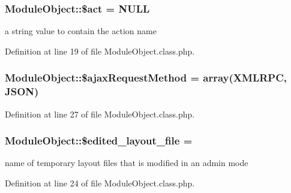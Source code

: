 \subsubsection[{\$act}]{\setlength{\rightskip}{0pt plus 5cm}Module\+Object\+::\$act = N\+U\+L\+L}\label{classModuleObject_a9d43905d072c53cd5cd239d706215895}


a string value to contain the action name 



Definition at line 19 of file Module\+Object.\+class.\+php.

\hypertarget{classModuleObject_a783d38cb68310dc6e5a1f6c1cc6c6b84}{}
\subsubsection[{\$ajax\+Request\+Method}]{\setlength{\rightskip}{0pt plus 5cm}Module\+Object\+::\$ajax\+Request\+Method = array(\textquotesingle{}X\+M\+L\+R\+P\+C\textquotesingle{}, \textquotesingle{}J\+S\+O\+N\textquotesingle{})}\label{classModuleObject_a783d38cb68310dc6e5a1f6c1cc6c6b84}


Definition at line 27 of file Module\+Object.\+class.\+php.

\hypertarget{classModuleObject_a1fcbb01c627ce5ff104c05f54715bd61}{}
\subsubsection[{\$edited\+\_\+layout\+\_\+file}]{\setlength{\rightskip}{0pt plus 5cm}Module\+Object\+::\$edited\+\_\+layout\+\_\+file = \textquotesingle{}\textquotesingle{}}\label{classModuleObject_a1fcbb01c627ce5ff104c05f54715bd61}


name of temporary layout files that is modified in an admin mode 



Definition at line 24 of file Module\+Object.\+class.\+php.

\hypertarget{classModuleObject_acda88247a161a0ddf878e8f504909329}{}

